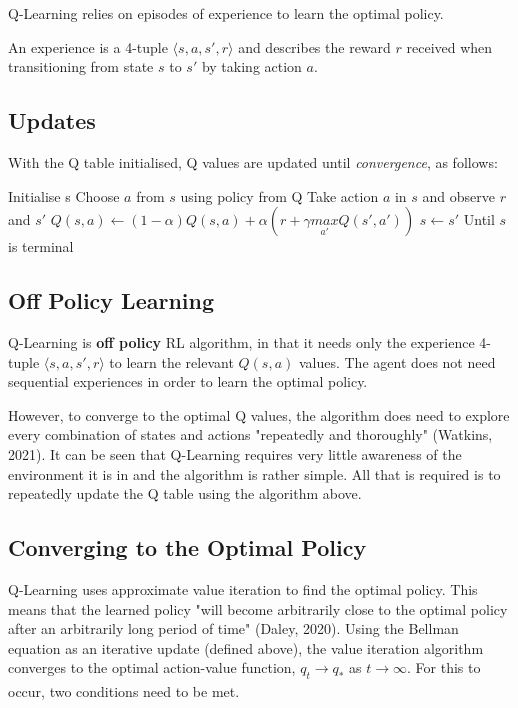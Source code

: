 \documentclass{article}
\begin{document}
Q-Learning relies on episodes of experience to learn the optimal policy. 

An experience is a 4-tuple $ \langle s, a, s', r \rangle$
and describes the reward $r$ received when transitioning from state $s$ to $s'$ by taking action $a$.

\subsection{Updates}

With the Q table initialised, Q values are updated until \textit{convergence}, as follows: 

\begin{algorithmic}
        \State Initialise s
            \State Choose $a$ from $s$ using policy from Q
            \State Take action $a$ in $s$ and observe $r$ and $s'$
            \State $Q(s,a) \gets (1 - \alpha) Q(s,a) + \alpha (r + \gamma \underset{a'}{max}Q(s', a'))$
            \State $s \gets s'$
        \EndFor
        \State Until $s$ is terminal
    \EndFor
\end{algorithmic}

\subsection{Off Policy Learning}

Q-Learning is \textbf{off policy} RL algorithm, in that it needs only the experience 4-tuple $ \langle s, a, s', r \rangle$ to learn the relevant $Q(s,a)$ values. The agent does not need sequential experiences in order to learn the optimal policy.

However, to converge to the optimal Q values, the algorithm does need to explore every combination of states and actions "repeatedly and thoroughly" (Watkins, 2021). It can be seen that Q-Learning requires very little awareness of the environment it is in and the algorithm is rather simple. All that is required is to repeatedly update the Q table using the algorithm above. 


\subsection{Converging to the Optimal Policy}

Q-Learning uses approximate value iteration to find the optimal policy. This means that the learned policy "will become arbitrarily close to the optimal policy after an arbitrarily long period of time" (Daley, 2020). Using the Bellman equation as an iterative update (defined above), the value iteration algorithm converges to the optimal action-value function, $q_t \xrightarrow[]{} q_*$ as $t \xrightarrow[]{} \infty$. For this to occur, two conditions need to be met. 
\end{document}
